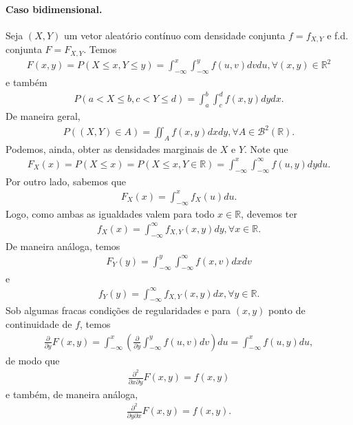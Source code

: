 \documentclass[../Notas.tex]{subfiles}
\begin{document}
\paragraph{Caso bidimensional.} Seja $(X,Y)$ um vetor aleatório contínuo com densidade conjunta $f = f_{X,Y}$ e f.d. conjunta $F = F_{X,Y}$. Temos
\begin{align*}
    F(x,y) = P(X\leq x, Y\leq y) = \int_{-\infty}^x\int_{-\infty}^y f(u,v) dvdu, \forall (x,y)\in\mathbb{R}^2
\end{align*}
e também
\begin{align*}
    P(a < X\leq b, c < Y\leq d) = \int_{a}^{b}\int_{c}^{d} f(x,y) dydx.
\end{align*}
De maneira geral, 
\begin{align*}
    P((X,Y)\in A) = \iint_A f(x,y) dxdy, \forall A\in\mathcal{B}^2(\mathbb{R}).
\end{align*}
Podemos, ainda, obter as densidades marginais de $X$ e $Y$. Note que
\begin{align*}
    F_X(x) = P(X\leq x) = P(X\leq x, Y\in\mathbb{R}) = \int_{-\infty}^{x}\int_{-\infty}^{\infty} f(u,y) dydu.
\end{align*}
Por outro lado, sabemos que
\begin{align*}
    F_X(x) = \int_{-\infty}^{x} f_X(u) du.
\end{align*}
Logo, como ambas as igualdades valem para todo $x\in\mathbb{R}$, devemos ter
\begin{align*}
    f_X(x) = \int_{-\infty}^{\infty} f_{X,Y}(x,y) dy, \forall x\in\mathbb{R}.
\end{align*}
De maneira análoga, temos
\begin{align*}
    F_Y(y) = \int_{-\infty}^{y}\int_{-\infty}^{\infty} f(x,v) dxdv
\end{align*}
e
\begin{align*}
    f_Y(y) = \int_{-\infty}^{\infty} f_{X,Y}(x,y) dx, \forall y\in\mathbb{R}.
\end{align*}
Sob algumas fracas condições de regularidades e para $(x,y)$ ponto de continuidade de $f$, temos
\begin{align*}
    \frac{\partial}{\partial y}F(x,y) = \int_{-\infty}^x \left( \frac{\partial}{\partial y} \int_{-\infty}^y f(u,v) dv \right) du = \int_{-\infty}^x f(u,y) du,
\end{align*}
de modo que
\begin{align*}
    \frac{\partial^2}{\partial x\partial y}F(x,y) = f(x,y)
\end{align*}
e também, de maneira análoga,
\begin{align*}
    \frac{\partial^2}{\partial y\partial x}F(x,y) = f(x,y).
\end{align*}
\end{document}
